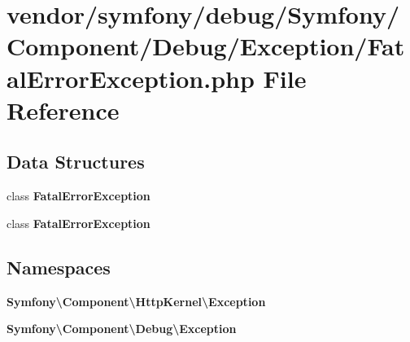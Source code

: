 \section{vendor/symfony/debug/\+Symfony/\+Component/\+Debug/\+Exception/\+Fatal\+Error\+Exception.php File Reference}
\label{symfony_2debug_2_symfony_2_component_2_debug_2_exception_2_fatal_error_exception_8php}
\subsection*{Data Structures}
\begin{DoxyCompactItemize}
\item 
class {\bf Fatal\+Error\+Exception}
\item 
class {\bf Fatal\+Error\+Exception}
\end{DoxyCompactItemize}
\subsection*{Namespaces}
\begin{DoxyCompactItemize}
\item 
 {\bf Symfony\textbackslash{}\+Component\textbackslash{}\+Http\+Kernel\textbackslash{}\+Exception}
\item 
 {\bf Symfony\textbackslash{}\+Component\textbackslash{}\+Debug\textbackslash{}\+Exception}
\end{DoxyCompactItemize}
